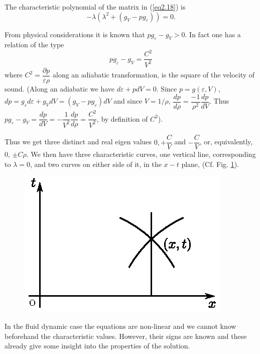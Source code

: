The characteristic polynomial of the matrix in (\ref{eq2.18}) is
\begin{equation*}
-\lambda (\lambda^2 + (g_V -pg_\varepsilon)) =0. \tag{2.19}\label{eq2.19}
\end{equation*}

From physical considerations it is known that $pg_\varepsilon - g_V >
0$. In fact one has a relation of the type
\begin{equation*}
pg_\varepsilon - g_V = \frac{C^2}{V^2}\tag{2.20}\label{eq2.20}
\end{equation*}
where $C^2 = \dfrac{\partial p}{\varepsilon \rho}$ along an
adiabatic transformation, is the square of the velocity of
sound. (Along an adiabatic we have $d \varepsilon + pd V =0$. Since
$p= g (\varepsilon ,V)$, $dp = g_\varepsilon d \varepsilon + g_V dV =
(g_V - pg_\varepsilon) dV$ and since $V = 1/\rho$,
$\dfrac{dp}{d\rho} = \dfrac{-1}{\rho^2} \dfrac{dp}{dV}$. Thus
$pg_\varepsilon - g_V = \dfrac{dp}{dV} = -\dfrac{1}{V^2}
\dfrac{dp}{d\rho} = \dfrac{C^2}{V^2}$, by definition of $C^2$). 

Thus we get three distinct and real eigen values $0, + \dfrac{C}{V}$
and $-\dfrac{C}{V}$, or, equivalently, $0$, $\pm C\rho$. We then
have three characteristic curves, one vertical line, corresponding to
$\lambda =0$, and two curves on either side of it, in the $x-t$ plane,
(Cf. Fig. \ref{c1:fig2.1}). 

\begin{figure}[H]
\centering
\includegraphics{figures/fig52-2.1.eps}
\caption{}\label{c1:fig2.1}
\end{figure}\pageoriginale

\begin{remark}\label{chap2:rem2.4}
In the fluid dynamic case the equations are non-linear and we cannot
know beforehand the characteristic values. However, their signs are
known and these already give some insight into the properties of the
solution. 
\end{remark}

